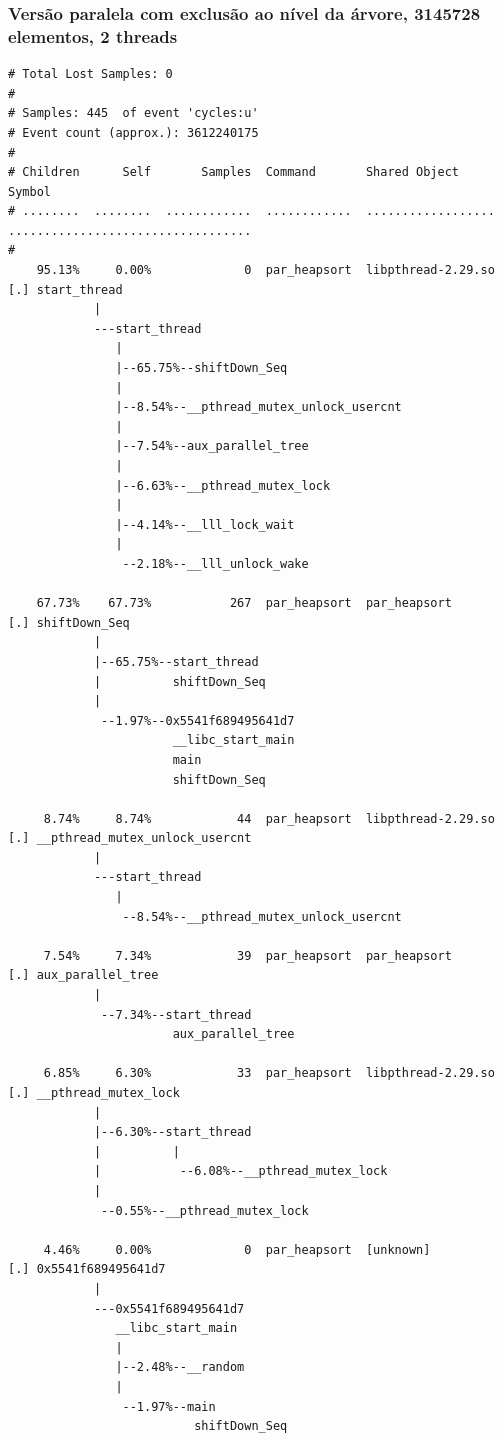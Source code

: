 \documentclass{article}
\begin{document}
\subsubsection{Versão paralela com exclusão ao nível da árvore, 3145728 elementos, 2 threads}
\scriptsize
\begin{verbatim}
# Total Lost Samples: 0
#
# Samples: 445  of event 'cycles:u'
# Event count (approx.): 3612240175
#
# Children      Self       Samples  Command       Shared Object       Symbol
# ........  ........  ............  ............  ..................  ..................................
#
    95.13%     0.00%             0  par_heapsort  libpthread-2.29.so  [.] start_thread
            |
            ---start_thread
               |
               |--65.75%--shiftDown_Seq
               |
               |--8.54%--__pthread_mutex_unlock_usercnt
               |
               |--7.54%--aux_parallel_tree
               |
               |--6.63%--__pthread_mutex_lock
               |
               |--4.14%--__lll_lock_wait
               |
                --2.18%--__lll_unlock_wake

    67.73%    67.73%           267  par_heapsort  par_heapsort        [.] shiftDown_Seq
            |
            |--65.75%--start_thread
            |          shiftDown_Seq
            |
             --1.97%--0x5541f689495641d7
                       __libc_start_main
                       main
                       shiftDown_Seq

     8.74%     8.74%            44  par_heapsort  libpthread-2.29.so  [.] __pthread_mutex_unlock_usercnt
            |
            ---start_thread
               |
                --8.54%--__pthread_mutex_unlock_usercnt

     7.54%     7.34%            39  par_heapsort  par_heapsort        [.] aux_parallel_tree
            |
             --7.34%--start_thread
                       aux_parallel_tree

     6.85%     6.30%            33  par_heapsort  libpthread-2.29.so  [.] __pthread_mutex_lock
            |
            |--6.30%--start_thread
            |          |
            |           --6.08%--__pthread_mutex_lock
            |
             --0.55%--__pthread_mutex_lock

     4.46%     0.00%             0  par_heapsort  [unknown]           [.] 0x5541f689495641d7
            |
            ---0x5541f689495641d7
               __libc_start_main
               |
               |--2.48%--__random
               |
                --1.97%--main
                          shiftDown_Seq


\end{verbatim}
\end{document}
